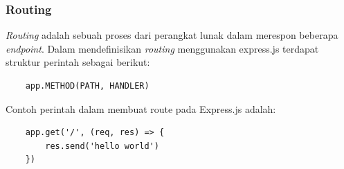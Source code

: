 \subsubsection{Routing}
\textit{Routing} adalah sebuah proses dari perangkat lunak dalam merespon beberapa \textit{endpoint}. Dalam mendefinisikan \textit{routing} menggunakan express.js terdapat struktur perintah sebagai berikut:
\begin{verbatim}
	app.METHOD(PATH, HANDLER)
\end{verbatim} 
Contoh perintah dalam membuat route pada Express.js adalah:
\begin{lstlisting}
	app.get('/', (req, res) => {
		res.send('hello world')
	})
\end{lstlisting}